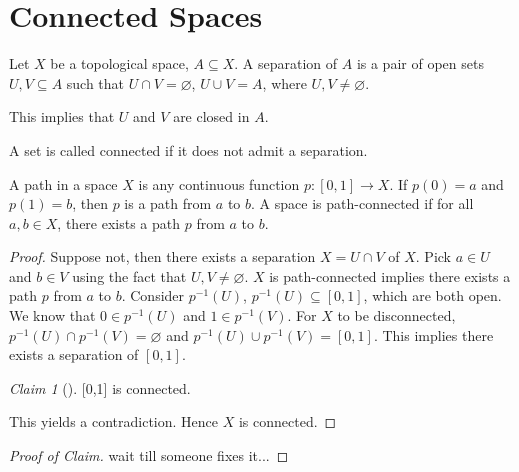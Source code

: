 \documentclass[article,11pt, reqno]{article}
\newtheorem*{lemma}{Lemma}
\theoremstyle{remark}
\newtheorem*{claim}{Claim}
\newcommand{\<}{\langle}
\renewcommand{\>}{\rangle}
\begin{document}
\section{Connected Spaces}
Let $X$ be a topological space, $A\subseteq X$. A separation of $A$ is a pair of open sets $U, V\subseteq A$ such that $U\cap V=\varnothing$, $U\cup V=A$, where $U, V\neq\varnothing$.

This implies that $U$ and $V$ are closed in $A$.

A set is called connected if it does not admit a separation.

A path in a space $X$ is any continuous function $p:[0,1]\rightarrow X$. If $p(0)=a$ and $p(1)=b$, then $p$ is a path from $a$ to $b$.
A space is path-connected if for all $a,b\in X$, there exists a path $p$ from $a$ to $b$.\\
\begin{proof}
    Suppose not, then there exists a separation $X=U\cap V$ of $X$. Pick $a\in U$ and $b\in V$ using the fact that $U,V\neq\varnothing$. $X$ is path-connected implies there exists a path $p$ from $a$ to $b$. Consider $p^{-1}(U)$, $p^{-1}(U)\subseteq[0,1]$, which are both open. We know that $0\in p^{-1}(U)$ and $1\in p^{-1}(V)$. For $X$ to be disconnected, $p^{-1}(U)\cap p^{-1}(V)=\varnothing$ and $p^{-1}(U)\cup p^{-1}(V)=[0,1]$. This implies there exists a separation of $[0,1]$.
    \begin{claim}[]
        [0,1] is connected.
    \end{claim}
    This yields a contradiction. Hence $X$ is connected.
\end{proof}
\begin{proof}[Proof of Claim]
    wait till someone fixes it...
\end{proof}
\end{document}
